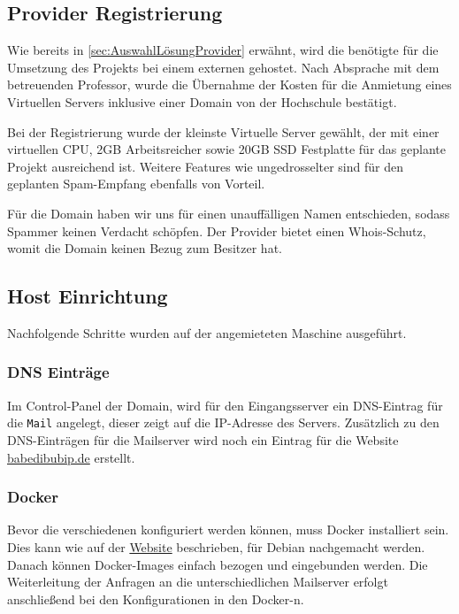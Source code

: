 \documentclass[a4paper,11pt,singlespacing]{article}
\begin{document}
	\subsection{Provider Registrierung}\label{sec:ProviderRegistrierung} 
		Wie bereits in \autoref{sec:AuswahlLösungProvider} erwähnt, wird die benötigte  für die Umsetzung des Projekts bei einem externen  gehostet.
		Nach Absprache mit dem betreuenden Professor, wurde die Übernahme der Kosten für die Anmietung eines Virtuellen Servers inklusive einer Domain von der Hochschule bestätigt.

		Bei der Registrierung wurde der kleinste Virtuelle Server gewählt, der mit einer virtuellen CPU, 2GB Arbeitsreicher sowie 20GB SSD Festplatte für das geplante Projekt ausreichend ist.
		Weitere Features wie ungedrosselter  sind für den geplanten Spam-Empfang ebenfalls von Vorteil.
		
		Für die Domain haben wir uns für einen unauffälligen Namen entschieden, sodass Spammer keinen Verdacht schöpfen.
		Der Provider bietet einen Whois-Schutz, womit die Domain keinen Bezug zum Besitzer hat.
		
	\subsection{Host Einrichtung}\label{sec:UmsetzungHostEinrichtung}
		Nachfolgende Schritte wurden auf der angemieteten Maschine ausgeführt.
		
		\subsubsection{DNS Einträge}\label{sec:DNSEinträge}
			Im Control-Panel der Domain, wird für den Eingangsserver ein DNS-Eintrag für die \texttt{Mail} angelegt, dieser  zeigt auf die IP-Adresse des Servers.
			Zusätzlich zu den DNS-Einträgen für die Mailserver wird noch ein Eintrag für die Website \href{https://babedibubip.de}{babedibubip.de} erstellt.

		\subsubsection{Docker}\label{sec:DockerAufsetzen}
			Bevor die verschiedenen  konfiguriert werden können, muss Docker installiert sein. Dies kann wie auf der  \href{https://docs.docker.com/install/linux/docker-ce/debian/}{Website} beschrieben, für  Debian nachgemacht werden.
			Danach können Docker-Images einfach bezogen und eingebunden werden.
			Die Weiterleitung der Anfragen an die unterschiedlichen Mailserver erfolgt anschlie{\ss}end bei den Konfigurationen in den Docker-n.
	
\end{document}
